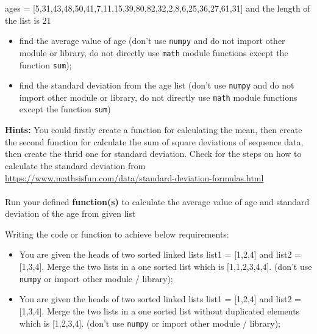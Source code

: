 \documentclass[a4paper]{article}
\begin{document}
    \begin{answer}[Question 1.1]
        ages = [5,31,43,48,50,41,7,11,15,39,80,82,32,2,8,6,25,36,27,61,31] and the length of the list is 21
        \begin{itemize}
            \item find the average value of age
            (don't use \texttt{numpy} and do not import other module or library, do not directly use \texttt{math} module functions except the function \texttt{sum});
            \item find the standard deviation from the age list
            (don't use \texttt{numpy} and do not import other module or library, do not directly use \texttt{math} module functions except the function \texttt{sum})
        \end{itemize}
        \textbf{Hints:}
        You could firstly create a function for calculating the mean,
        then create the second function for calculate the sum of square deviations of sequence data, then create the thrid one for standard deviation. Check for the steps on how to calculate the standard deviation from \url{https://www.mathsisfun.com/data/standard-deviation-formulas.html}\\
        \\
        Run your defined \textbf{function(s)} to calculate the average value of age and standard deviation of the age from given list
    \end{answer}

    \begin{answer}[Question 1.2]
    Writing the code or function to achieve below requirements:
        \begin{itemize}
            \item You are given the heads of two sorted linked lists list1 = [1,2,4] and list2 = [1,3,4]. Merge the two lists in a one sorted list which is [1,1,2,3,4,4]. (don't use \texttt{numpy} or import other module / library);
            \item You are given the heads of two sorted linked lists list1 = [1,2,4] and list2 = [1,3,4]. Merge the two lists in a one sorted list without duplicated elements which is [1,2,3,4]. (don't use \texttt{numpy} or import other module / library);
        \end{itemize}
    \end{answer}
\end{document}
